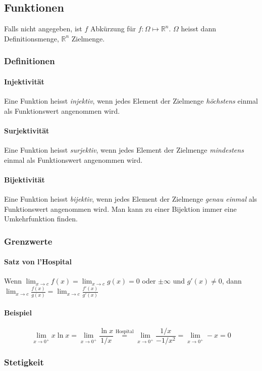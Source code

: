 \documentclass[a4paper, 9pt, DIV=24]{scrartcl}
\newcommand{\R}{\mathbb{R}}
\begin{document}
\subsection{Funktionen}
Falls nicht angegeben, ist $f$ Abkürzung für $f: \Omega \mapsto \R^n$. $\Omega$ heisst dann Definitionsmenge, $\R^n$ Zielmenge.
\subsubsection{Definitionen}
\paragraph{Injektivität}
Eine Funktion heisst \emph{injektiv}, wenn jedes Element der Zielmenge \emph{höchstens} einmal als Funktionswert angenommen wird.
\paragraph{Surjektivität}
Eine Funktion heisst \emph{surjektiv}, wenn jedes Element der Zielmenge \emph{mindestens} einmal als Funktionswert angenommen wird.
\paragraph{Bijektivität}
Eine Funktion heisst \emph{bijektiv}, wenn jedes Element der Zielmenge \emph{genau einmal} als Funktionswert angenommen wird. Man kann zu einer Bijektion immer eine Umkehrfunktion finden.
\subsubsection{Grenzwerte}
\paragraph{Satz von l'Hospital}
Wenn $\lim_{x \to c}f(x) = \lim_{x \to c}g(x)= 0 $ oder $\pm\infty$ und $g'(x)\neq 0$, dann $\lim_{x\to c}\frac{f(x)}{g(x)} = \lim_{x\to c}\frac{f'(x)}{g'(x)}$
\paragraph{Beispiel}
\[ \lim_{x\to 0^+} x \ln x =\lim_{x\to 0^+}{\frac{\ln x}{1/x}} \overset{\text{Hospital}}{=}\lim_{x\to 0^+}{\frac{1/x}{-1/x^2}} =\lim_{x\to 0^+} -x= 0 \]

\subsubsection{Stetigkeit}
\end{document}
